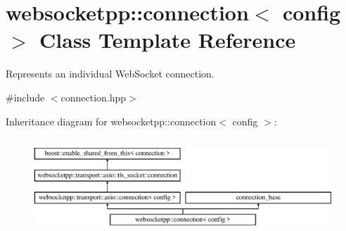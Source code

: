 \hypertarget{classwebsocketpp_1_1connection}{}\section{websocketpp\+:\+:connection$<$ config $>$ Class Template Reference}
\label{classwebsocketpp_1_1connection}


Represents an individual Web\+Socket connection.  




{\ttfamily \#include $<$connection.\+hpp$>$}

Inheritance diagram for websocketpp\+:\+:connection$<$ config $>$\+:\begin{figure}[H]
\begin{center}
\leavevmode
\includegraphics[height=3.648208cm]{classwebsocketpp_1_1connection}
\end{center}
\end{figure}
